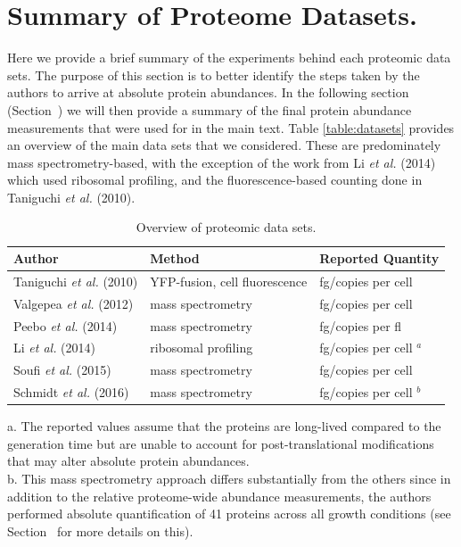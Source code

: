 \section{Summary of Proteome Datasets.}
\label{sec:SI_exp_summary}

Here we provide a brief summary of the experiments behind each proteomic data
sets. The purpose of this section is to better identify the steps taken by the
authors to arrive at absolute protein abundances. In the following section
(Section~) we will then provide a summary of the
final protein abundance measurements that were used for in the main text. Table
\ref{table:datasets} provides an overview of the main data sets that we
considered. These are predominately mass spectrometry-based, with the exception
of the work from Li \textit{et al.} (2014) which used ribosomal profiling, and
the fluorescence-based counting done in Taniguchi \textit{et al.} (2010).

\begin{table}[bt]
\caption{\label{tab:datasets}Overview of proteomic data sets.}
\begin{tabular}{l l l }
\toprule
Author & Method & Reported Quantity \\
\midrule
Taniguchi \textit{et al.} (2010)  & YFP-fusion, cell fluorescence    & fg/copies per cell      \\
Valgepea \textit{et al.} (2012)   & mass spectrometry                & fg/copies per cell      \\
Peebo \textit{et al.} (2014)      & mass spectrometry                & fg/copies per fl        \\
Li \textit{et al.} (2014)         & ribosomal profiling              & fg/copies per cell $^a$ \\
Soufi \textit{et al.} (2015)      & mass spectrometry                & fg/copies per cell      \\
Schmidt \textit{et al.} (2016)    & mass spectrometry                & fg/copies per cell $^b$ \\
\bottomrule
\end{tabular}

\medskip
a. The reported values assume that the proteins are long-lived compared to the
generation time but are unable to account for post-translational modifications
that may alter absolute protein abundances.
\\
b. This mass spectrometry approach differs substantially from the others since
in addition to the relative proteome-wide abundance measurements, the authors
performed absolute quantification of 41 proteins across all growth conditions
(see Section~ for more details on this).
\end{table}

